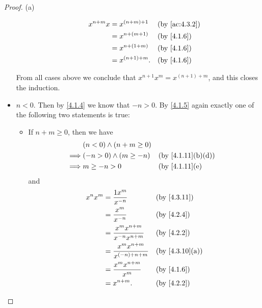 \begin{proof}{(a)}
\begin{itemize}
\begin{itemize}
\begin{align*}
                    x^{n + m} x & = x^{(n + m) + 1}  &  & \text{(by \cref{ac:4.3.2})} \\
                                & = x^{n + (m + 1)}  &  & \text{(by \cref{4.1.6})}    \\
                                & = x^{n + (1 + m)}  &  & \text{(by \cref{4.1.6})}    \\
                                & = x^{(n + 1) + m}. &  & \text{(by \cref{4.1.6})}
                  \end{align*}
          \end{itemize}
          From all cases above we conclude that \(x^{n + 1} x^m = x^{(n + 1) + m}\), and this closes the induction.
    \item \(n < 0\).
          Then by \cref{4.1.4} we know that \(-n > 0\).
          By \cref{4.1.5} again exactly one of the following two statements is true:
          \begin{itemize}
            \item If \(n + m \geq 0\), then we have
                  \begin{align*}
                             & (n < 0) \land (n + m \geq 0)                                      \\
                    \implies & (-n > 0) \land (m \geq -n)   &  & \text{(by \cref{4.1.11}(b)(d))} \\
                    \implies & m \geq -n > 0                &  & \text{(by \cref{4.1.11}(e)}
                  \end{align*}
                  and
                  \begin{align*}
                    x^n x^m & = \dfrac{1x^m}{x^{-n}}                    &  & \text{(by \cref{4.3.11})}    \\
                            & = \dfrac{x^m}{x^{-n}}                     &  & \text{(by \cref{4.2.4})}     \\
                            & = \dfrac{x^m x^{n + m}}{x^{-n} x^{n + m}} &  & \text{(by \cref{4.2.2})}     \\
                            & = \dfrac{x^m x^{n + m}}{x^{(-n) + n + m}} &  & \text{(by \cref{4.3.10}(a))} \\
                            & = \dfrac{x^m x^{n + m}}{x^m}              &  & \text{(by \cref{4.1.6})}     \\
                            & = x^{n + m}.                              &  & \text{(by \cref{4.2.2})}
                  \end{align*}

\end{itemize}
\end{itemize}
\end{proof}
